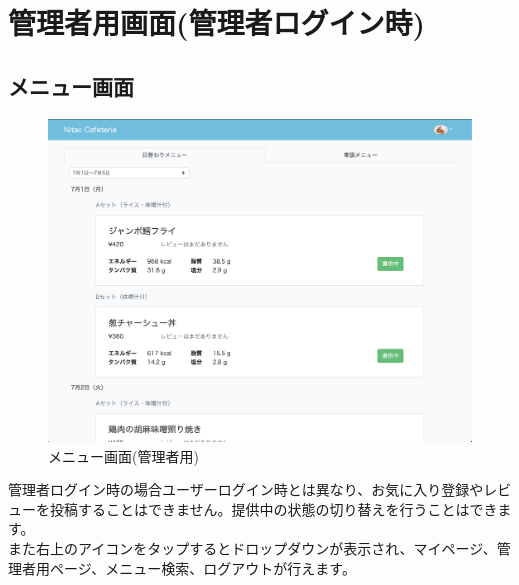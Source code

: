 \documentclass[a4paper]{jsarticle}
\begin{document}
\section{管理者用画面(管理者ログイン時)}
\subsection{メニュー画面}
\begin{figure}[htbp]
	\centering
		\caption{メニュー画面(管理者用)}
		\includegraphics[scale = 0.225]{image/menu_admin.png}
	\end{figure}
	管理者ログイン時の場合ユーザーログイン時とは異なり、お気に入り登録やレビューを投稿することはできません。提供中の状態の切り替えを行うことはできます。\\
	また右上のアイコンをタップするとドロップダウンが表示され、マイページ、管理者用ページ、メニュー検索、ログアウトが行えます。
	\newpage
\end{document}
